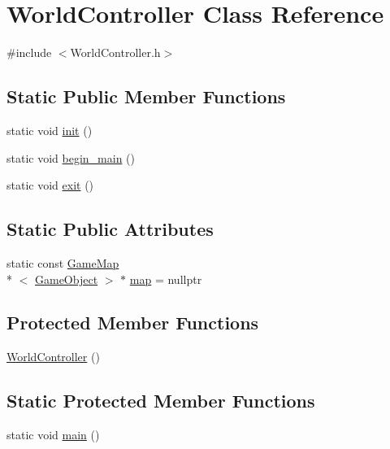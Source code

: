 \hypertarget{class_world_controller}{\section{World\-Controller Class Reference}
\label{class_world_controller}
}


{\ttfamily \#include $<$World\-Controller.\-h$>$}

\subsection*{Static Public Member Functions}
\begin{DoxyCompactItemize}
\item 
static void \hyperlink{class_world_controller_afbbfb68f628affc0294ba4dfae1c0f57}{init} ()
\item 
static void \hyperlink{class_world_controller_a41fed52dbb0b5821cad8fba591462f01}{begin\-\_\-main} ()
\item 
static void \hyperlink{class_world_controller_ab02f125f52eccfc19b5c426a16236610}{exit} ()
\end{DoxyCompactItemize}
\subsection*{Static Public Attributes}
\begin{DoxyCompactItemize}
\item 
static const \hyperlink{class_game_map}{Game\-Map}\\*
$<$ \hyperlink{class_game_object}{Game\-Object} $>$ $\ast$ \hyperlink{class_world_controller_a1970186c27a575110308f83e7268f375}{map} = nullptr
\end{DoxyCompactItemize}
\subsection*{Protected Member Functions}
\begin{DoxyCompactItemize}
\item 
\hyperlink{class_world_controller_ad8c94c8dc3358f4473cddf848ea08953}{World\-Controller} ()
\end{DoxyCompactItemize}
\subsection*{Static Protected Member Functions}
\begin{DoxyCompactItemize}
\item 
static void \hyperlink{class_world_controller_a9d558bd43591117ec3263c790b185d00}{main} ()
\end{DoxyCompactItemize}
